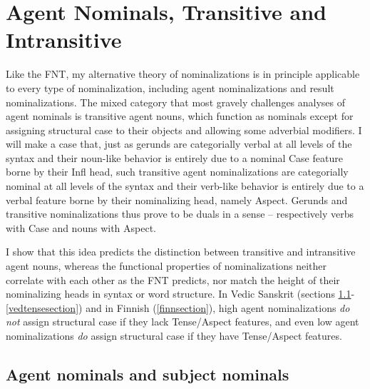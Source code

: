\documentclass[output=paper,
modfonts
]{LSP/langsci}
\begin{document}
\section{Agent Nominals, Transitive and Intransitive}
\label{agentsection}

Like the FNT, my alternative theory of nominalizations is in principle applicable to every type
of nominalization, including agent nominalizations and result
nominalizations.  The mixed category that most gravely challenges analyses of agent nominals is transitive agent
nouns, which function as nominals except for assigning structural case to their objects and
allowing some adverbial modifiers.  I will make a case that, just as gerunds are categorially
verbal at all levels of the syntax and their noun-like behavior is entirely due to a nominal
Case feature borne by their Infl head, such transitive agent nominalizations are categorially
nominal at all levels of the syntax and their verb-like behavior is entirely due to a verbal
feature borne by their nominalizing head, namely Aspect.  Gerunds and transitive
nominalizations thus prove to be duals in a sense – respectively verbs with Case and nouns with
Aspect.

I show that this idea predicts the distinction between transitive and intransitive agent nouns,
whereas the functional properties of nominalizations neither correlate with
each other as the FNT predicts, nor match the height of their nominalizing heads in syntax or
word structure.  In Vedic Sanskrit (sections \ref{vedagentsection}-\ref{vedtensesection}) and
in Finnish (\ref{finnsection}), high agent nominalizations \textit{do not} assign structural
case if they lack Tense/Aspect features, and even low agent nominalizations \textit{do} assign
structural case if they have Tense/Aspect features.  

\subsection{Agent nominals and subject nominals}
\label{vedagentsection}
\end{document}
